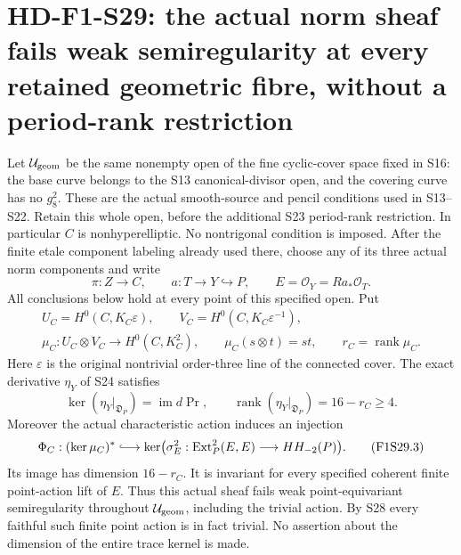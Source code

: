 \section[HD-F1-S29: uniform obstruction on the geometric norm-source open]{HD-F1-S29: the actual norm sheaf fails weak semiregularity at every retained geometric fibre, without a period-rank restriction}
\label{sec:f1-norm-fourfold-uniform-obstruction}

Let $\mathcal U_{\rm geom}$ be the same nonempty open of the
fine cyclic-cover space fixed in S16: the base curve belongs
to the S13 canonical-divisor open, and the covering curve has
no $g^2_8$. These are the actual smooth-source and pencil
conditions used in S13--S22. Retain this whole open, before
the additional S23 period-rank restriction. In particular
$C$ is nonhyperelliptic. No nontrigonal condition is imposed.
After the finite etale component labeling already used there,
choose any of its three actual norm components and write
\[
 \pi:Z\to C,\qquad a:T\longrightarrow Y\hookrightarrow P,
 \qquad E=\mathcal O_Y=Ra_*\mathcal O_T.
\]
All conclusions below hold at every point of this specified
open. Put
\[
 \begin{gathered}
 U_C=H^0(C,K_C\varepsilon),\qquad
 V_C=H^0(C,K_C\varepsilon^{-1}),\\
 \mu_C:U_C\otimes V_C\longrightarrow H^0(C,K_C^2),
 \qquad \mu_C(s\otimes t)=st,\qquad
 r_C=\operatorname{rank}\mu_C.
 \end{gathered}
 \tag{F1S29.1}
\]
Here $\varepsilon$ is the original nontrivial order-three
line of the connected cover. The exact derivative $\eta_Y$
of S24 satisfies
\[
 \ker(\eta_Y|_{\mathfrak D_P})
       =\operatorname{im}d\operatorname{Pr},\qquad
 \operatorname{rank}(\eta_Y|_{\mathfrak D_P})=16-r_C\ge4.
 \tag{F1S29.2}
\]
Moreover the actual characteristic action induces an injection
\[
 \Phi_C:(\ker\mu_C)^*\lhook\joinrel\longrightarrow
  \ker\bigl(\sigma_E^2:\operatorname{Ext}^2_P(E,E)
                                      \longrightarrow HH_{-2}(P)\bigr).
 \tag{F1S29.3}
\]
Its image has dimension $16-r_C$. It is invariant for every
specified coherent finite point-action lift of $E$.
Thus this actual sheaf fails weak point-equivariant
semiregularity throughout $\mathcal U_{\rm geom}$, including
the trivial action. By S28 every faithful such finite point
action is in fact trivial. No assertion about the dimension
of the entire trace kernel is made.

